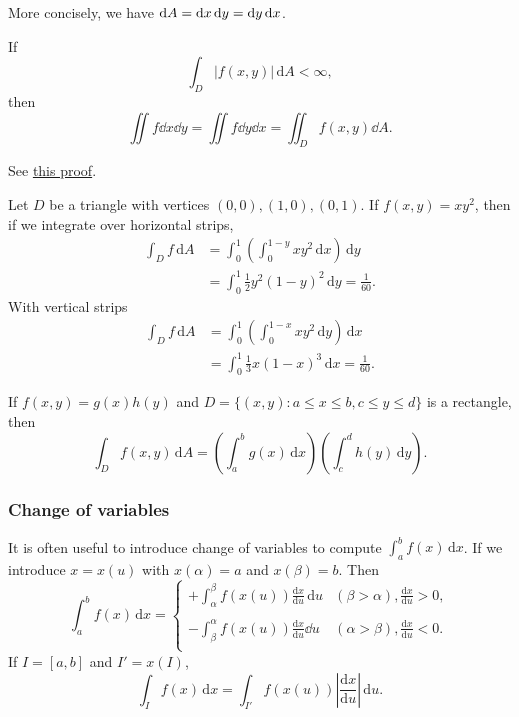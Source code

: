 More concisely, we have $ \mathrm{d} A = \mathrm{d} x\,\mathrm{d} y=\mathrm{d} y\,\mathrm{d} x $.
\begin{theorem}\label{thm:Fubini's theorem}
    If
    \[
        \int_{D} \left| f(x,y) \right| \,\mathrm{d}A<\infty,
    \]
    then 
    \[
        \iint f\dd x\dd y = \iint f\dd y\dd x = \iint_{D}f(x,y)\dd A.
    \]
\end{theorem}
See \href{https://dec41.user.srcf.net/notes/II_M/probability_and_measure.pdf\#page=50}{this proof}.

\begin{example}
    Let $D$ be a triangle with vertices $(0,0),(1,0),(0,1)$. If $f(x,y)=xy^2$, then if we integrate over horizontal strips,
    \begin{align*}
        \int_{D} f \,\mathrm{d}A &= \int_{0}^{1} \left( \int_{0}^{1-y} xy^2 \,\mathrm{d}x \right) \,\mathrm{d}y\\ 
        &= \int_{0}^{1} \frac{1}{2}y^2(1-y)^2 \,\mathrm{d}y = \frac{1}{60}.
    \end{align*}
    With vertical strips 
    \begin{align*}
        \int_{D} f \,\mathrm{d}A &= \int_{0}^{1} \left( \int_{0}^{1-x} xy^2 \,\mathrm{d}y \right) \,\mathrm{d}x\\ 
        &= \int_{0}^{1} \frac{1}{3}x(1-x)^3 \,\mathrm{d}x = \frac{1}{60}.
    \end{align*}
\end{example}

\begin{proposition}
    If $f(x,y)=g(x)h(y)$ and $ D=\{(x,y):a\le x\le b,c\le y\le d\} $ is a rectangle, then 
    \[
        \int_{D} f(x,y) \,\mathrm{d}A = \left( \int_{a}^{b} g(x) \,\mathrm{d}x \right) \left( \int_{c}^{d} h(y) \,\mathrm{d}y \right).
    \]
\end{proposition}

\subsubsection{Change of variables}

It is often useful to introduce change of variables to compute $ \int_{a}^{b} f(x) \,\mathrm{d}x $. If we introduce $ x=x(u) $ with $ x(\alpha)=a $ and $ x(\beta)=b $. Then 
\[
    \int_{a}^{b} f(x) \,\mathrm{d}x = \begin{cases}
    \displaystyle+\int_{\alpha}^{\beta} f(x(u))\frac{\mathrm{d}x}{\mathrm{d}u}  \,\mathrm{d}u &\displaystyle(\beta>\alpha),\frac{\mathrm{d}x}{\mathrm{d}u}>0, \\
    \\
    \displaystyle-\int_{\beta}^{\alpha} f(x(u))\frac{\mathrm{d}x}{\mathrm{d}u}\dd u &\displaystyle(\alpha>\beta),\frac{\mathrm{d}x}{\mathrm{d}u}<0. \\
    \end{cases} 
\]
If $I=[a,b]$ and $I'=x(I)$,
\[
    \int_{I} f(x) \,\mathrm{d}x = \int_{I'} f(x(u)) \left| \frac{\mathrm{d}x}{\mathrm{d}u}  \right|  \,\mathrm{d}u.
\]

